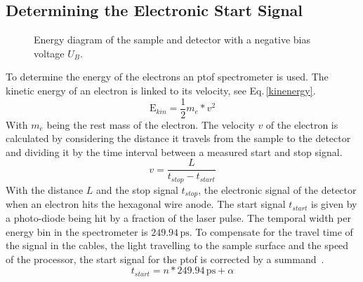 \documentclass[a4paper,12pt,twoside]{article}
\begin{document}
       \subsection{Determining the Electronic Start Signal}
            \label{chapDESS}
    \begin{figure}
		\caption{Energy diagram of the sample and detector with a negative bias voltage $U_B$.}
	    	\label{bias}
	\end{figure}
To determine the energy of the electrons an \gls{ptof} spectrometer is used. The kinetic energy of an electron is linked to its velocity, see Eq.\,\ref{kinenergy}.
    \begin{equation}
        \label{kinenergy}
        \mathrm{E}_{kin} = \frac{ 1 }{ 2 } m_{ e }*v^{ 2 }
    \end{equation}
With $m_{e}$ being the rest mass of the electron.
The velocity $v$ of the electron is calculated by considering the distance it travels from the sample to the detector and dividing it by the time interval between a measured start and stop signal.
    \begin{equation}
        \label{velocity}
        v = \frac{ L }{ t_{stop} - t_{ start }  }
    \end{equation}
With the distance $L$ and the stop signal $t_{stop}$, the electronic signal of the detector when an electron hits the hexagonal wire anode. The start signal $t_{start}$ is given by a photo-diode being hit by a fraction of the laser pulse. The temporal width per energy bin in the spectrometer is $249.94\,\mathrm{ps}$.  To compensate for the travel time of the signal in the cables, the light travelling to the sample surface and the speed of the processor, the start signal for the \gls{ptof} is corrected by a summand \textalpha\,\cite{Lisowski}.
    \begin{equation}
        \label{startsignal}
        t_{start} = n * 249.94\,\mathrm{ps} + \alpha
    \end{equation}
\end{document}
